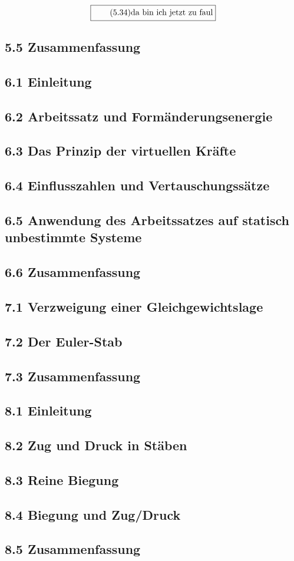 \documentclass[11pt]{article}
\newcommand{\1}{ {\mathds{1}} }
\begin{document}
    \begin{equation}
      \boxed{
        \tag{5.34}
        \begin{split}
          \text{da bin ich jetzt zu faul}
        \end{split}
      }
    \end{equation}
    
    \subsection*{5.5 Zusammenfassung}	

    \subsection*{6.1 Einleitung}
    \subsection*{6.2 Arbeitssatz und Formänderungsenergie}
    \subsection*{6.3 Das Prinzip der virtuellen Kräfte}
    \subsection*{6.4 Einflusszahlen und Vertauschungssätze}
    \subsection*{6.5 Anwendung des Arbeitssatzes auf statisch unbestimmte Systeme}
    \subsection*{6.6 Zusammenfassung}

    \subsection*{7.1 Verzweigung einer Gleichgewichtslage}
    \subsection*{7.2 Der Euler-Stab}
    \subsection*{7.3 Zusammenfassung}
	
    \subsection*{8.1 Einleitung}
    \subsection*{8.2 Zug und Druck in Stäben}
    \subsection*{8.3 Reine Biegung}
    \subsection*{8.4 Biegung und Zug/Druck}
    \subsection*{8.5 Zusammenfassung}
	
\end{document}
